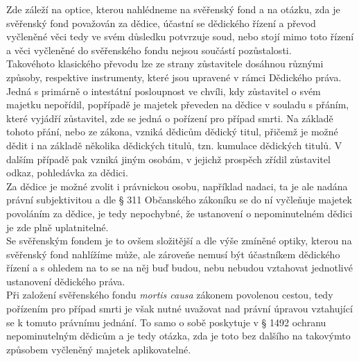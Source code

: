\documentclass{article}
\begin{document}
Zde záleží na optice, kterou nahlédneme na svěřenský fond a na otázku, zda je svěřenský fond považován za dědice, účastní se dědického řízení a převod vyčleněné věci tedy ve svém důsledku potvrzuje soud, nebo stojí mimo toto řízení a věci vyčleněné do svěřenského fondu nejsou součástí pozůstalosti.\\

Takovéhoto klasického převodu lze ze strany zůstavitele dosáhnou různými způsoby, respektive instrumenty, které jsou upravené v rámci Dědického práva. Jedná s primárně o intestátní posloupnost ve chvíli, kdy zůstavitel o svém majetku nepořídil, popřípadě je majetek převeden na dědice v souladu s přáním, které vyjádří zůstavitel, zde se jedná o pořízení pro případ smrti. Na základě tohoto přání, nebo ze zákona, vzniká dědicům dědický titul, přičemž je možné dědit i na základě několika dědických titulů, tzn. kumulace dědických titulů. V dalším případě pak vzniká jiným osobám, v jejichž prospěch zřídil zůstavitel odkaz, pohledávka za dědici.\\

Za dědice je možné zvolit i právnickou osobu, například nadaci, ta je ale nadána právní subjektivitou a dle § 311 Občanského zákoníku se do ní vyčleňuje majetek povoláním za dědice, je tedy nepochybné, že ustanovení o nepominutelném dědici je zde plně uplatnitelné.\\

Se svěřenským fondem je to ovšem složitější a dle výše zmíněné optiky, kterou na svěřenský fond nahlížíme může, ale zároveňe nemusí být účastníkem dědického řízení a s ohledem na to se na něj buď budou, nebu nebudou vztahovat jednotlivé ustanovení dědického práva.\\

Při založení svěřenského fondu \textit{mortis causa} zákonem povolenou cestou, tedy pořízením pro případ smrti je však nutné uvažovat nad právní úpravou vztahující se k tomuto právnímu jednání. To samo o sobě poskytuje v § 1492 ochranu nepominutelným dědicům a je tedy otázka, zda je toto bez dalšího na takovýmto způsobem vyčleněný majetek aplikovatelné.\\


\end{document}
